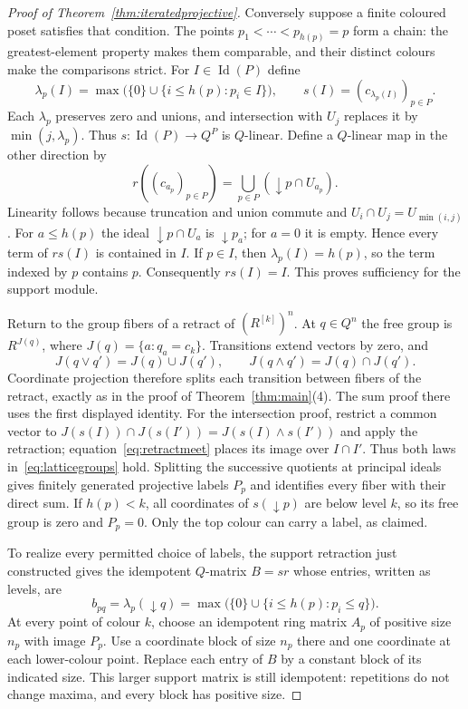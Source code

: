 \documentclass[11pt]{amsart}
\DeclareMathOperator{\Id}{Id}
\theoremstyle{definition}
\theoremstyle{remark}
\begin{document}
\begin{proof}[Proof of Theorem~\ref{thm:iteratedprojective}]
Conversely suppose a finite coloured poset satisfies that condition. The points $p_1<\cdots<p_{h(p)}=p$ form a chain: the greatest-element property makes them comparable, and their distinct colours make the comparisons strict. For $I\in\Id(P)$ define
\[
 \lambda_p(I)=\max\bigl(\{0\}\cup\{i\le h(p):p_i\in I\}\bigr),\qquad
 s(I)=(c_{\lambda_p(I)})_{p\in P}.
\]
Each $\lambda_p$ preserves zero and unions, and intersection with $U_j$ replaces it by $\min(j,\lambda_p)$. Thus $s:\Id(P)\to Q^P$ is $Q$-linear. Define a $Q$-linear map in the other direction by
\[
 r((c_{a_p})_{p\in P})=\bigcup_{p\in P}(\downarrow p\cap U_{a_p}).
\]
Linearity follows because truncation and union commute and $U_i\cap U_j=U_{\min(i,j)}$. For $a\le h(p)$ the ideal $\downarrow p\cap U_a$ is $\downarrow p_a$; for $a=0$ it is empty. Hence every term of $rs(I)$ is contained in $I$. If $p\in I$, then $\lambda_p(I)=h(p)$, so the term indexed by $p$ contains $p$. Consequently $rs(I)=I$. This proves sufficiency for the support module.

Return to the group fibers of a retract of $(R^{[k]})^n$. At $q\in Q^n$ the free group is $R^{J(q)}$, where $J(q)=\{a:q_a=c_k\}$. Transitions extend vectors by zero, and
\[
 J(q\vee q')=J(q)\cup J(q'),\qquad
 J(q\wedge q')=J(q)\cap J(q').
\]
Coordinate projection therefore splits each transition between fibers of the retract, exactly as in the proof of Theorem~\ref{thm:main}(4). The sum proof there uses the first displayed identity. For the intersection proof, restrict a common vector to $J(s(I))\cap J(s(I'))=J(s(I)\wedge s(I'))$ and apply the retraction; equation~\eqref{eq:retractmeet} places its image over $I\cap I'$. Thus both laws in~\eqref{eq:latticegroups} hold. Splitting the successive quotients at principal ideals gives finitely generated projective labels $P_p$ and identifies every fiber with their direct sum. If $h(p)<k$, all coordinates of $s(\downarrow p)$ are below level $k$, so its free group is zero and $P_p=0$. Only the top colour can carry a label, as claimed.

To realize every permitted choice of labels, the support retraction just constructed gives the idempotent $Q$-matrix $B=sr$ whose entries, written as levels, are
\[
 b_{pq}=\lambda_p(\downarrow q)
 =\max\bigl(\{0\}\cup\{i\le h(p):p_i\le q\}\bigr).
\]
At every point of colour $k$, choose an idempotent ring matrix $A_p$ of positive size $n_p$ with image $P_p$. Use a coordinate block of size $n_p$ there and one coordinate at each lower-colour point. Replace each entry of $B$ by a constant block of its indicated size. This larger support matrix is still idempotent: repetitions do not change maxima, and every block has positive size.


\end{proof}
\end{document}
